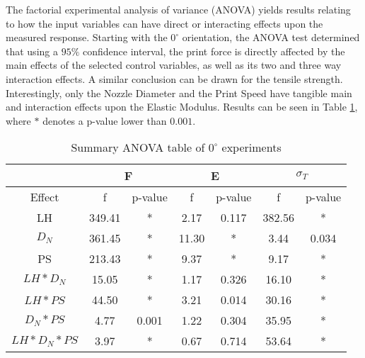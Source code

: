 \documentclass[main.tex]{subfiles}
\begin{document}
The factorial experimental analysis of variance (ANOVA) yields results relating to how the input variables can have direct or interacting effects upon the measured response. Starting with the $0^{\circ}$ orientation, the ANOVA test determined that using a $95\%$ confidence interval, the print force is directly affected by the main effects of the selected control variables, as well as its two and three way interaction effects. A similar conclusion can be drawn for the tensile strength. Interestingly, only the Nozzle Diameter and the Print Speed have tangible main and interaction effects upon the Elastic Modulus. Results can be seen in Table \ref{tab:anova_0}, where $*$ denotes a p-value lower than $0.001$.

\begin{table}[!htbp]
	\renewcommand{\arraystretch}{1.5}
	\centering
	\caption{Summary ANOVA table of $0^{\circ}$ experiments}
	\label{tab:anova_0}
	\begin{tabular}{ccccccc}
	\hline
	& \multicolumn{2}{c}{F}                 & \multicolumn{2}{c}{E}                & \multicolumn{2}{c}{$\sigma_{T}$} \\ \hline
	\multicolumn{1}{c|}{Effect}        & f      & \multicolumn{1}{c|}{p-value} & f     & \multicolumn{1}{c|}{p-value} & f              & p-value         \\
	\multicolumn{1}{c|}{LH}            & 349.41 & \multicolumn{1}{c|}{*}       & 2.17  & \multicolumn{1}{c|}{0.117}   & 382.56         & *               \\
	\multicolumn{1}{c|}{$D_{N}$}       & 361.45 & \multicolumn{1}{c|}{*}       & 11.30 & \multicolumn{1}{c|}{*}       & 3.44           & 0.034           \\
	\multicolumn{1}{c|}{PS}            & 213.43 & \multicolumn{1}{c|}{*}       & 9.37  & \multicolumn{1}{c|}{*}       & 9.17           & *               \\
	\multicolumn{1}{c|}{$LH*D_{N}$}    & 15.05  & \multicolumn{1}{c|}{*}       & 1.17  & \multicolumn{1}{c|}{0.326}   & 16.10          & *               \\
	\multicolumn{1}{c|}{$LH*PS$}       & 44.50  & \multicolumn{1}{c|}{*}       & 3.21  & \multicolumn{1}{c|}{0.014}   & 30.16          & *               \\
	\multicolumn{1}{c|}{$D_{N}*PS$}    & 4.77   & \multicolumn{1}{c|}{0.001}   & 1.22  & \multicolumn{1}{c|}{0.304}   & 35.95          & *               \\
	\multicolumn{1}{c|}{$LH*D_{N}*PS$} & 3.97   & \multicolumn{1}{c|}{*}       & 0.67  & \multicolumn{1}{c|}{0.714}   & 53.64          & *               \\ \hline
\end{tabular}
\end{table} 
\end{document}
